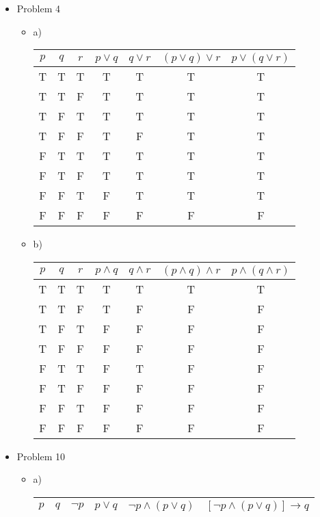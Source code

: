 \documentclass[10pt,a4paper]{article}
\begin{document}
\begin{itemize}
\begin{itemize}
    \item Problem 4
    \begin{itemize}
      \item a)
      \begin{tabular}{|c|c|c||c|c||c|c|}
        \hline
        $p$ & $q$ & $r$ & $p\lor q$ & $q\lor r$ & $(p\lor q)\lor r$ & $p\lor (q\lor r)$ \\ \hline
        T & T & T & T & T & T & T \\ 
        T & T & F & T & T & T & T \\
        T & F & T & T & T & T & T \\
        T & F & F & T & F & T & T \\
        F & T & T & T & T & T & T \\
        F & T & F & T & T & T & T \\
        F & F & T & F & T & T & T \\
        F & F & F & F & F & F & F \\
        \hline
      \end{tabular}
      \item b)
      \begin{tabular}{|c|c|c||c|c||c|c|}
        \hline
        $p$ 
        & $q$ 
        & $r$ 
        & $p\land q$ 
        & $q\land r$ 
        & $(p\land q)\land r$ 
        & $p\land (q\land r)$ \\ \hline
        T & T & T & T & T & T & T \\ 
        T & T & F & T & F & F & F \\
        T & F & T & F & F & F & F \\
        T & F & F & F & F & F & F \\ \hline
        F & T & T & F & T & F & F \\
        F & T & F & F & F & F & F \\
        F & F & T & F & F & F & F \\
        F & F & F & F & F & F & F \\
        \hline
      \end{tabular}
    \end{itemize}
    \item Problem 10
    \begin{itemize}
      \item a)
      \begin{tabular}{|c|c||c|c|c|c|}
        \hline
        $p$ & $q$ & $\lnot p$ & $p\lor q$ & $\lnot p\land (p\lor q)$ & $[ \lnot p\land (p\lor q) ]\to q $\\ \hline

\end{tabular}
\end{itemize}
\end{itemize}
\end{itemize}
\end{document}
